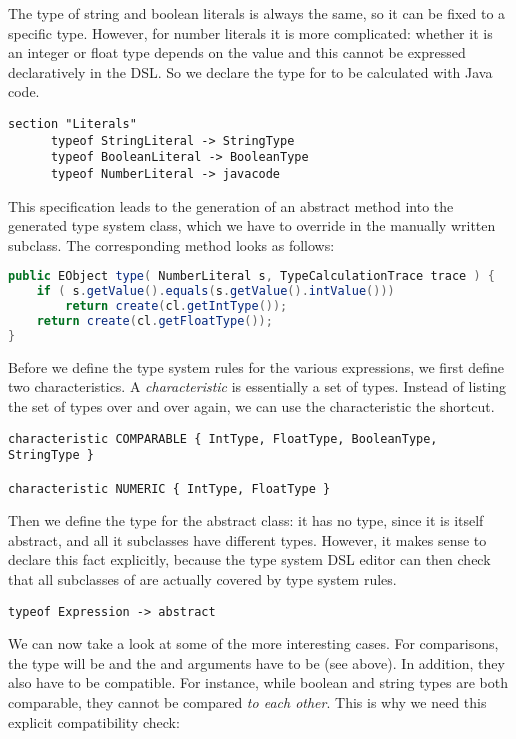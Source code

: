 The type of string and boolean literals is always the same, so it can
be fixed to a specific type.
However, for number literals it is more complicated:
whether it is an integer or float type depends on the value and this cannot be
expressed declaratively in the DSL. So we declare the type for
 to be calculated with Java code.

\begin{lstlisting}[language=xts] 
section "Literals"
      typeof StringLiteral -> StringType
      typeof BooleanLiteral -> BooleanType
      typeof NumberLiteral -> javacode
\end{lstlisting}
 
This specification leads to the generation of an abstract method into the
generated type system class, which we have to override in the manually written
subclass. The corresponding method looks as follows:
 
\begin{lstlisting}[language=Java] 
public EObject type( NumberLiteral s, TypeCalculationTrace trace ) {
    if ( s.getValue().equals(s.getValue().intValue()))
        return create(cl.getIntType());
    return create(cl.getFloatType());
} 
\end{lstlisting}



Before we define the type system rules for the various expressions,  we first
define two characteristics. A \emph{characteristic} is essentially a set of
types. Instead of listing the set of types over and over again, we can use the
characteristic the shortcut.

\begin{lstlisting}[language=xts] 
characteristic COMPARABLE { IntType, FloatType, BooleanType, StringType }  
  
characteristic NUMERIC { IntType, FloatType } 
\end{lstlisting}

Then we define the type for the abstract  class: it 
has no type, since it is itself abstract, and all it subclasses have different
types. However, it makes sense to declare this fact explicitly, because the type
system DSL editor can then check that all subclasses of  are actually
covered by type system rules.

\begin{lstlisting}[language=xts]
typeof Expression -> abstract
\end{lstlisting}

We can now take a look at some of the more interesting cases. For comparisons,
the type will be  and the  and  arguments
have to be  (see above). In addition, they also have to be compatible.
For instance, while boolean and string types are both comparable, they cannot be
compared \emph{to each other}. This is why we need this explicit compatibility check:

